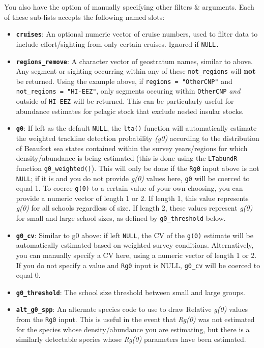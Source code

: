 \documentclass[
]{book}
\begin{document}
You also have the option of manually specifying other filters \& arguments. Each of these sub-lists accepts the following named slots:

\begin{itemize}
\item
  \textbf{\texttt{cruises}}: An optional numeric vector of cruise numbers, used to filter data to include effort/sighting from only certain cruises. Ignored if \texttt{NULL.}
\item
  \textbf{\texttt{regions\_remove}}: A character vector of geostratum names, similar to above. Any segment or sighting occurring within any of these \texttt{not\_regions} will \textbf{not} be returned. Using the example above, if \texttt{regions\ =\ "OtherCNP"} and \texttt{not\_regions\ =\ "HI-EEZ"}, only segments occuring within \texttt{OtherCNP} \emph{and} outside of \texttt{HI-EEZ} will be returned. This can be particularly useful for abundance estimates for pelagic stock that exclude nested insular stocks.
\item
  \textbf{\texttt{g0}}: If left as the default \texttt{NULL}, the \texttt{lta()} function will automatically estimate the weighted trackline detection probability \emph{(g0)} according to the distribution of Beaufort sea states contained within the survey years/regions for which density/abundance is being estimated (this is done using the \texttt{LTabundR} function \texttt{g0\_weighted()}). This will only be done if the \texttt{Rg0} input above is not \texttt{NULL}; if it is and you do not provide \emph{g(0)} values here, \texttt{g0} will be coerced to equal 1. To coerce \texttt{g(0)} to a certain value of your own choosing, you can provide a numeric vector of length 1 or 2. If length 1, this value represents \emph{g(0)} for all schools regardless of size. If length 2, these values represent \emph{g(0)} for small and large school sizes, as defined by \texttt{g0\_threshold} below.
\item
  \textbf{\texttt{g0\_cv}}: Similar to g0 above: if left \texttt{NULL}, the CV of the \texttt{g(0)} estimate will be automatically estimated based on weighted survey conditions. Alternatively, you can manually specify a CV here, using a numeric vector of length 1 or 2. If you do not specify a value and \texttt{Rg0} input is NULL, \texttt{g0\_cv} will be coerced to equal 0.
\item
  \textbf{\texttt{g0\_threshold}}: The school size threshold between small and large groups.
\item
  \textbf{\texttt{alt\_g0\_spp}}: An alternate species code to use to draw Relative \emph{g(0)} values from the \texttt{Rg0} input. This is useful in the event that \emph{Rg(0)} was not estimated for the species whose density/abundance you are estimating, but there is a similarly detectable species whose \emph{Rg(0)} parameters have been estimated.

\end{itemize}
\end{document}
